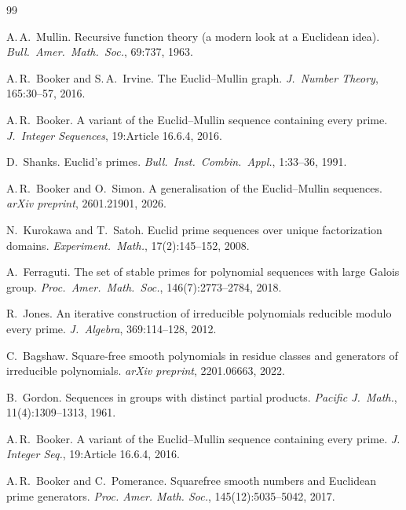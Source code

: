 \newpage
\begin{thebibliography}{99}

A.\,A.~Mullin.
\newblock Recursive function theory (a modern look at a Euclidean idea).
\newblock \emph{Bull.\ Amer.\ Math.\ Soc.}, 69:737, 1963.

A.\,R.~Booker and S.\,A.~Irvine.
\newblock The {E}uclid--{M}ullin graph.
\newblock \emph{J.\ Number Theory}, 165:30--57, 2016.

A.\,R.~Booker.
\newblock A variant of the {E}uclid--{M}ullin sequence containing every prime.
\newblock \emph{J.\ Integer Sequences}, 19:Article 16.6.4, 2016.

D.~Shanks.
\newblock Euclid's primes.
\newblock \emph{Bull.\ Inst.\ Combin.\ Appl.}, 1:33--36, 1991.

A.\,R.~Booker and O.~Simon.
\newblock A generalisation of the {E}uclid--{M}ullin sequences.
\newblock \emph{arXiv preprint}, 2601.21901, 2026.

N.~Kurokawa and T.~Satoh.
\newblock Euclid prime sequences over unique factorization domains.
\newblock \emph{Experiment.\ Math.}, 17(2):145--152, 2008.

A.~Ferraguti.
\newblock The set of stable primes for polynomial sequences with large {G}alois group.
\newblock \emph{Proc.\ Amer.\ Math.\ Soc.}, 146(7):2773--2784, 2018.

R.~Jones.
\newblock An iterative construction of irreducible polynomials reducible modulo every prime.
\newblock \emph{J.\ Algebra}, 369:114--128, 2012.

C.~Bagshaw.
\newblock Square-free smooth polynomials in residue classes and generators of
  irreducible polynomials.
\newblock \emph{arXiv preprint}, 2201.06663, 2022.

B.~Gordon.
\newblock Sequences in groups with distinct partial products.
\newblock \emph{Pacific J.\ Math.}, 11(4):1309--1313, 1961.

A.\,R.~Booker.
\newblock A variant of the {E}uclid--{M}ullin sequence containing every prime.
\newblock \emph{J. Integer Seq.}, 19:Article 16.6.4, 2016.

A.\,R.~Booker and C.~Pomerance.
\newblock Squarefree smooth numbers and {E}uclidean prime generators.
\newblock \emph{Proc. Amer. Math. Soc.}, 145(12):5035--5042, 2017.


\end{thebibliography}
